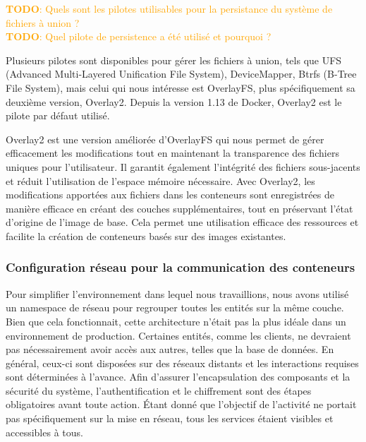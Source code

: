 \documentclass[a11paper, 11pt]{article}
\newcommand{\todo}[1]{\textcolor{orange}{\textbf{TODO}: #1}}
\begin{document}
\todo{Quels sont les pilotes utilisables pour la persistance du système de fichiers
à union ?} \\
\todo{Quel pilote de persistence a été utilisé et pourquoi ?}

Plusieurs pilotes sont disponibles pour gérer les fichiers à union, tels que UFS (Advanced Multi-Layered Unification File System), DeviceMapper, Btrfs (B-Tree File System), mais celui qui nous intéresse est OverlayFS, plus spécifiquement sa deuxième version, Overlay2. Depuis la version 1.13 de Docker, Overlay2 est le pilote par défaut utilisé.

Overlay2 est une version améliorée d'OverlayFS qui nous permet de gérer efficacement les modifications tout en maintenant la transparence des fichiers uniques pour l'utilisateur. Il garantit également l'intégrité des fichiers sous-jacents et réduit l'utilisation de l'espace mémoire nécessaire. Avec Overlay2, les modifications apportées aux fichiers dans les conteneurs sont enregistrées de manière efficace en créant des couches supplémentaires, tout en préservant l'état d'origine de l'image de base. Cela permet une utilisation efficace des ressources et facilite la création de conteneurs basés sur des images existantes.

\subsubsection{Configuration réseau pour la communication des conteneurs}

Pour simplifier l'environnement dans lequel nous travaillions, nous avons utilisé un namespace de réseau pour regrouper toutes les entités sur la même couche. Bien que cela fonctionnait, cette architecture n'était pas la plus idéale dans un environnement de production. Certaines entités, comme les clients, ne devraient pas nécessairement avoir accès aux autres, telles que la base de données. En général, ceux-ci sont disposées sur des réseaux distants et les interactions requises sont déterminées à l'avance. Afin d'assurer l'encapsulation des composants et la sécurité du système, l'authentification et le chiffrement sont des étapes obligatoires avant toute action. Étant donné que l'objectif de l'activité ne portait pas spécifiquement sur la mise en réseau, tous les services étaient visibles et accessibles à tous.
\end{document}
